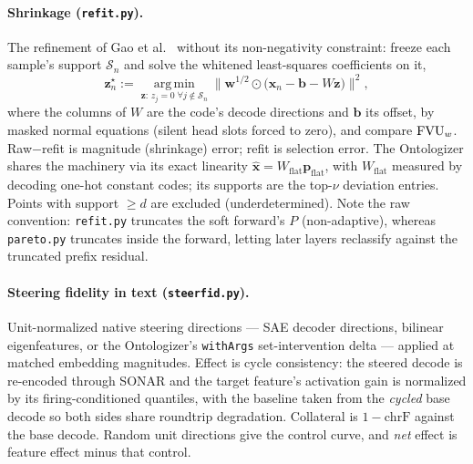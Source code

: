 \paragraph{Shrinkage (\texttt{refit.py}).}
The refinement of Gao et al.~\cite{gao2024} without its non-negativity
constraint: freeze each sample's support $\mathcal{S}_n$ and solve the
whitened least-squares coefficients on it,
\begin{equation}
	\mathbf{z}^{\star}_n := \operatorname*{arg\,min}_{\mathbf{z} :\, z_j = 0 \;\forall j \notin \mathcal{S}_n}
	\big\lVert \mathbf{w}^{1/2} \odot \big(\mathbf{x}_n - \mathbf{b} - W \mathbf{z}\big)\big\rVert^2,
	\label{eq:refit}
\end{equation}
where the columns of $W$ are the code's decode directions and
$\mathbf{b}$ its offset, by masked normal equations (silent head slots
forced to zero), and compare $\mathrm{FVU}_w$. Raw$-$refit is magnitude (shrinkage)
error; refit is selection error. The Ontologizer shares the machinery via
its exact linearity $\hat{\mathbf{x}} = W_{\mathrm{flat}}
\mathbf{p}_{\mathrm{flat}}$, with $W_{\mathrm{flat}}$ measured by decoding one-hot
constant codes; its supports are the top-$\nu$ deviation entries.
Points with support $\geq d$ are excluded (underdetermined). Note the raw
convention: \texttt{refit.py} truncates the soft forward's $P$
(non-adaptive), whereas \texttt{pareto.py} truncates inside the forward,
letting later layers reclassify against the truncated prefix residual.

\paragraph{Steering fidelity in text (\texttt{steerfid.py}).}
Unit-normalized native steering directions --- SAE decoder directions, bilinear
eigenfeatures, or the Ontologizer's \texttt{withArgs} set-intervention
delta --- applied at matched embedding magnitudes. Effect is cycle
consistency: the steered decode is re-encoded through SONAR and the target
feature's activation gain is normalized by its firing-conditioned
quantiles, with the baseline taken from the \emph{cycled} base decode so
both sides share roundtrip degradation. Collateral is $1 - \mathrm{chrF}$
against the base decode. Random unit directions give the control curve,
and \emph{net} effect is feature effect minus that control.


